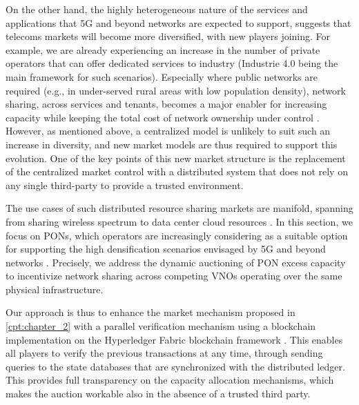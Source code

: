 On the other hand, the highly heterogeneous nature of the services and applications that \ac{5G} and beyond networks are expected to support, suggests that telecoms markets will become more diversified, with new players joining. For example, we are already experiencing an increase in the number of private operators that can offer dedicated services to industry (Industrie 4.0 being the main framework for such scenarios).
Especially where public networks are required (e.g., in under-served rural areas with low population density), network sharing, across services and tenants, becomes a major enabler for increasing capacity while keeping the total cost of network ownership under control \cite{6035827}.
However, as mentioned above, a centralized model is unlikely to suit such an increase in diversity, and new market models are thus required to support this evolution.
One of the key points of this new market structure is the replacement of the centralized market control with a distributed system that does not rely on any single third-party to provide a trusted environment.

The use cases of such distributed resource sharing markets are manifold, spanning from sharing wireless spectrum \cite{7194843} to data center cloud resources \cite{7296648}. In this section, we focus on \acp{PON}, which operators are increasingly considering as a suitable option for supporting the high densification scenarios envisaged by \ac{5G} and beyond networks \cite{6886953}.
Precisely, we address the dynamic auctioning of \ac{PON} excess capacity to incentivize network sharing across competing \acp{VNO} operating over the same physical infrastructure.

Our approach is thus to enhance the market mechanism proposed in \autoref{cpt:chapter_2} with a parallel verification mechanism using a blockchain implementation on the Hyperledger Fabric blockchain framework \cite{fabric}. This enables all players to verify the previous transactions at any time, through sending queries to the state databases that are synchronized with the distributed ledger. This provides full transparency on the capacity allocation mechanisms, which makes the auction workable also in the absence of a trusted third party.


